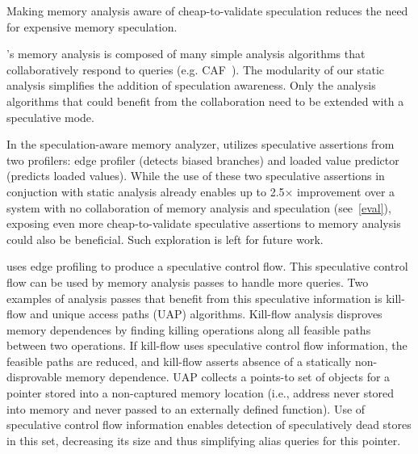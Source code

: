 %
%

Making memory analysis aware of cheap-to-validate speculation reduces the
need for expensive memory speculation.

\name's memory analysis is composed of many simple analysis algorithms
that collaboratively respond to queries (e.g.
CAF~\cite{johnson:cgo:17}).
%
The modularity of our static analysis simplifies the addition of
speculation awareness. Only the analysis algorithms that could
benefit from the collaboration need to be extended with a
speculative mode.
%

In the speculation-aware memory analyzer, \name utilizes speculative
assertions from two profilers: edge profiler (detects biased
branches) and loaded value predictor (predicts loaded values).
%
While the use of these two speculative assertions in conjuction with static
analysis already enables up to 2.5$\times$ improvement over a system with
no collaboration of memory analysis and speculation (see~\cref{eval}),
exposing even more cheap-to-validate speculative assertions to memory
analysis could also be beneficial.  Such exploration is left for future
work.%

\name uses edge profiling to produce a speculative control flow. This
speculative control flow can be used by memory analysis passes to
handle more queries.
%
Two examples of analysis passes that benefit from this speculative
information is kill-flow and unique access paths (UAP) algorithms.
%
Kill-flow analysis disproves memory dependences by finding killing
operations along all feasible paths between two operations.  If
kill-flow uses speculative control flow information, the feasible
paths are reduced, and kill-flow asserts absence of a statically
non-disprovable memory dependence.
%
UAP collects a points-to set of objects for a pointer stored into a
non-captured memory location (i.e., address never stored into memory
and never passed to an externally defined function).
Use of speculative control flow information enables detection of
speculatively dead stores in this set, decreasing its size and thus
simplifying alias queries for this pointer.

